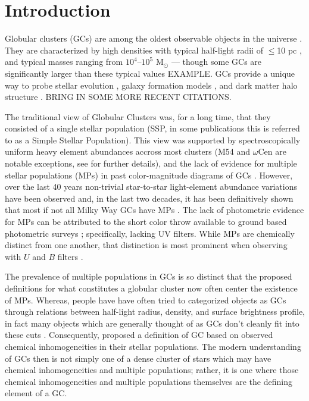 \section{Introduction}\label{sec:Intro}
Globular clusters (GCs) are among the oldest observable objects in the
universe \citep{Pen11}. They are characterized by high densities with typical
half-light radii of $\le$10 pc \citep{Vanderburg2010}, and typical masses
ranging from $10^{4}$--$10^{5}$ M$_{\odot}$ \citep{Bro06} --- though some GCs
are significantly larger than these typical values {\color{red}EXAMPLE}. GCs
provide a unique way to probe stellar evolution \citep{Bau03}, galaxy formation
models \citep{Boy18,Kra05}, and dark matter halo structure \citep{Hud18}.
{\color{red} BRING IN SOME MORE RECENT CITATIONS.}

The traditional view of Globular Clusters was, for a long time, that they
consisted of a single stellar population (SSP, in some publications this is
referred to as a Simple Stellar Population). This view was supported by
spectroscopically uniform heavy element abundances \citep{Carretta2010, Bastian2018} accross most clusters (M54 and $\omega$Cen are notable exceptions, see \citet{Marino2015} for further details), and the lack of evidence for multiple stellar populations
(MPs) in past color-magnitude diagrams of GCs \citep[i.e.][]{Sandage1953, Alcaino1975}. However, over the last 40 years non-trivial star-to-star light-element abundance variations have been observed \citep[i.e.][]{Smith1987} and, in
the last two decades, it has been definitively shown that most if not all Milky
Way GCs have MPs \citep{Gratton2004, Gratton2012, Piotto2015}. The lack of photometric evidence for MPs
can be attributed to the short color throw available to ground based
photometric surveys \citep{Milone2017}; specifically, lacking UV filters. While MPs are chemically distinct
from one another, that distinction is most prominent when observing with $U$
and $B$ filters \citep{Sbordone2011}.

The prevalence of multiple populations in GCs is so distinct that the proposed
definitions for what constitutes a globular cluster now often center the
existence of MPs. Whereas, people have have often tried to categorized objects
as GCs through relations between half-light radius, density, and surface
brightness profile, in fact many objects which are generally thought of as GCs
don't cleanly fit into these cuts \citep{Peebles1968, Brown1991, Brown1995, Bekki2002}.
Consequently, \citet{Carretta2010} proposed a definition of GC based on
observed chemical inhomogeneities in their stellar populations. The modern
understanding of GCs then is not simply one of a dense cluster of stars which
may have chemical inhomogeneities and multiple populations; rather, it is one
where those chemical inhomogeneities and multiple populations themselves are
the defining element of a GC.

